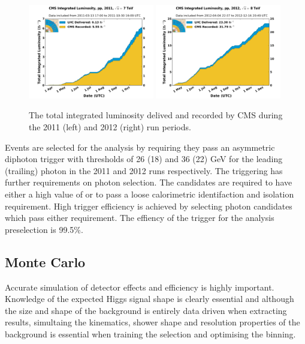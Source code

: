 \begin{figure}
  \includegraphics[width=0.49\textwidth]{ch3_comm_anal_comps/plots/int_lumi_2011.pdf}
  \includegraphics[width=0.49\textwidth]{ch3_comm_anal_comps/plots/int_lumi_2012.pdf}
  \caption{The total integrated luminosity delived and recorded by CMS during the 2011 (left) and 2012 (right) run periods.}
  \label{fig:intlumi}
\end{figure}

Events are selected for the analysis by requiring they pass an asymmetric diphoton trigger with \ET thresholds of 26 (18) and 36 (22) GeV for the leading (trailing) photon in the 2011 and 2012 runs respectively. The triggering has further requirements on photon selection. The candidates are required to have either a high value of \rnine or to pass a loose calorimetric identifaction and isolation requirement. High trigger efficiency is achieved by selecting photon candidates which pass either requirement. The effiency of the trigger for the analysis preselection is 99.5\%.

\subsection{Monte Carlo}
\label{sec:mc}

Accurate simulation of detector effects and efficiency is highly important. Knowledge of the expected Higgs signal shape is clearly essential and although the size and shape of the \mgg background is entirely data driven when extracting results, simultaing the kinematics, shower shape and resolution properties of the background is essential when training the selection and optimising the binning. 

